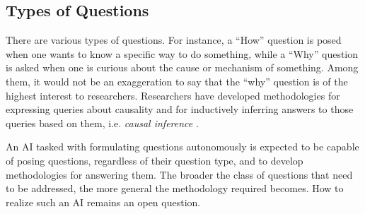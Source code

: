 
\subsection{Types of Questions}
There are various types of questions. For instance, a ``How'' question is posed when one wants to know a specific way to do something, while a ``Why'' question is asked when one is curious about the cause or mechanism of something. Among them, it would not be an exaggeration to say that the ``why'' question is of the highest interest to researchers. Researchers have developed methodologies for expressing queries about causality and for inductively inferring answers to those queries based on them, i.e.\textit{ causal inference} \cite{pearl2018book}.

An AI tasked with formulating questions autonomously is expected to be capable of posing questions, regardless of their question type, and to develop methodologies for answering them. The broader the class of questions that need to be addressed, the more general the methodology required becomes. How to realize such an AI remains an open question.






